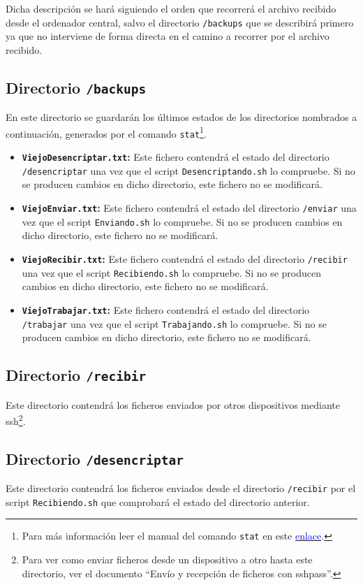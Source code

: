 \documentclass[12pt,letterpaper]{article}
\begin{document}
Dicha descripción se hará siguiendo el orden que recorrerá el archivo recibido desde el ordenador central, salvo el directorio \texttt{/backups} que se describirá primero ya que no interviene de forma directa en el camino a recorrer por el archivo recibido.

\subsection{Directorio \texttt{/backups}}
En este directorio se guardarán los últimos estados de los directorios nombrados a continuación, generados por el comando \texttt{stat}\footnote{Para más información leer el manual del comando \texttt{stat} en este \href{https://linux.die.net/man/2/stat}{\textcolor{blue}{enlace}}.}.
\begin{itemize}
	\item \textbf{\texttt{ViejoDesencriptar.txt}:} Este fichero contendrá el estado del directorio \texttt{/desencriptar} una vez que el script \texttt{Desencriptando.sh} lo compruebe. Si no se producen cambios en dicho directorio, este fichero no se modificará.
	\item \textbf{\texttt{ViejoEnviar.txt}:} Este fichero contendrá el estado del directorio \texttt{/enviar} una vez que el script \texttt{Enviando.sh} lo compruebe. Si no se producen cambios en dicho directorio, este fichero no se modificará.
	\item \textbf{\texttt{ViejoRecibir.txt}:} Este fichero contendrá el estado del directorio \texttt{/recibir} una vez que el script \texttt{Recibiendo.sh} lo compruebe. Si no se producen cambios en dicho directorio, este fichero no se modificará.
	\item \textbf{\texttt{ViejoTrabajar.txt}:} Este fichero contendrá el estado del directorio \texttt{/trabajar} una vez que el script \texttt{Trabajando.sh} lo compruebe. Si no se producen cambios en dicho directorio, este fichero no se modificará.
\end{itemize}

\subsection{Directorio \texttt{/recibir}}
Este directorio contendrá los ficheros enviados por otros dispositivos mediante ssh\footnote{Para ver como enviar ficheros desde un dispositivo a otro hasta este directorio, ver el documento ``Envío y recepción de ficheros con sshpass''.}.

\subsection{Directorio \texttt{/desencriptar}}
Este directorio contendrá los ficheros enviados desde el directorio \texttt{/recibir} por el script \texttt{Recibiendo.sh} que comprobará el estado del directorio anterior.
\end{document}
